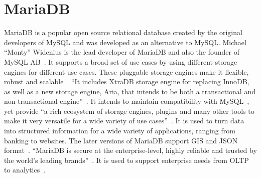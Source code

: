 \section{MariaDB}
 
MariaDB is a popular open source relational database created by the
original developers of MySQL and was developed as an alternative to
MySQL\@. Michael ``Monty'' Widenius is the lead developer of MariaDB and
also the founder of MySQL AB~\cite{hid-sp18-516-wiki-mariadb}. It
supports a broad set of use cases by using different storage engines
for different use cases. These pluggable storage engines make it
flexible, robust and scalable~\cite{hid-sp18-516-mariadb-server}. ``It
includes XtraDB storage engine for replacing InnoDB, as well as a new
storage engine, Aria, that intends to be both a transactional and
non-transactional engine''~\cite{hid-sp18-516-wiki-mariadb}. It
intends to maintain compatibility with
MySQL~\cite{hid-sp18-516-wiki-mariadb}, yet provide ``a rich ecosystem
of storage engines, plugins and many other tools to make it very
versatile for a wide variety of use
cases''~\cite{hid-sp18-516-mariadb-foundation}. It is used to turn
data into structured information for a wide variety of applications,
ranging from banking to websites. The later versions of MariaDB
support GIS and JSON
format~\cite{hid-sp18-516-mariadb-foundation}. ``MariaDB is secure at
the enterprise-level, highly reliable and trusted by the world's
leading brands''~\cite{hid-sp18-516-mariadb}. It is used to support
enterprise needs from OLTP to analytics~\cite{hid-sp18-516-mariadb}.
 

